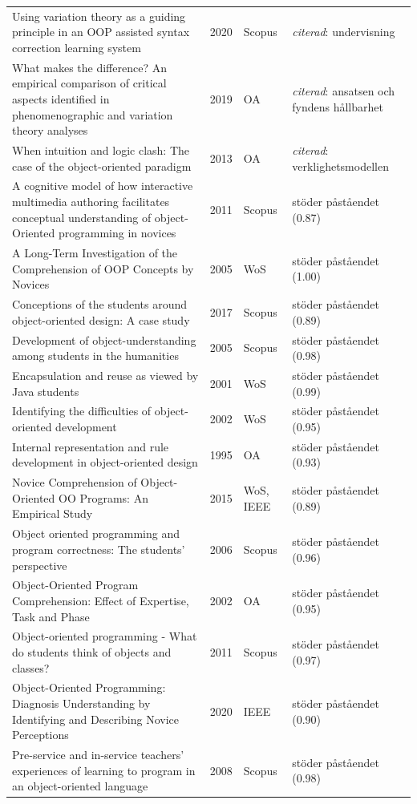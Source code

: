 \begin{longtable}{@{}%
  >{\raggedright\arraybackslash}p{}c%
  >{\raggedright\arraybackslash}p{}%
  >{\raggedright\arraybackslash}p{}@{}}
Using variation theory as a guiding principle in an OOP assisted syntax correction learning system & 2020 & Scopus & \emph{citerad}: undervisning \\
What makes the difference? An empirical comparison of critical aspects identified in phenomenographic and variation theory analyses & 2019 & OA & \emph{citerad}: ansatsen och fyndens hållbarhet \\
When intuition and logic clash: The case of the object-oriented paradigm & 2013 & OA & \emph{citerad}: verklighetsmodellen \\
A cognitive model of how interactive multimedia authoring facilitates conceptual understanding of object-Oriented programming in novices & 2011 & Scopus & stöder påståendet (0.87) \\
A Long-Term Investigation of the Comprehension of OOP Concepts by Novices & 2005 & WoS & stöder påståendet (1.00) \\
Conceptions of the students around object-oriented design: A case study & 2017 & Scopus & stöder påståendet (0.89) \\
Development of object-understanding among students in the humanities & 2005 & Scopus & stöder påståendet (0.98) \\
Encapsulation and reuse as viewed by Java students & 2001 & WoS & stöder påståendet (0.99) \\
Identifying the difficulties of object-oriented development & 2002 & WoS & stöder påståendet (0.95) \\
Internal representation and rule development in object-oriented design & 1995 & OA & stöder påståendet (0.93) \\
Novice Comprehension of Object-Oriented OO Programs: An Empirical Study & 2015 & WoS, IEEE & stöder påståendet (0.89) \\
Object oriented programming and program correctness: The students' perspective & 2006 & Scopus & stöder påståendet (0.96) \\
Object-Oriented Program Comprehension: Effect of Expertise, Task and Phase & 2002 & OA & stöder påståendet (0.95) \\
Object-oriented programming - What do students think of objects and classes? & 2011 & Scopus & stöder påståendet (0.97) \\
Object-Oriented Programming: Diagnosis Understanding by Identifying and Describing Novice Perceptions & 2020 & IEEE & stöder påståendet (0.90) \\
Pre-service and in-service teachers' experiences of learning to program in an object-oriented language & 2008 & Scopus & stöder påståendet (0.98) \\

\end{longtable}
